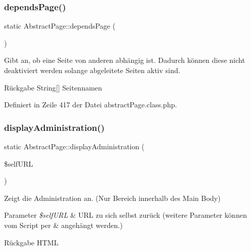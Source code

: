 \mbox{\label{class_abstract_page_a5b1e5f7cf097755dd4ede7a81742a192}} 
\subsubsection{\texorpdfstring{depends\+Page()}{dependsPage()}}
{\footnotesize\ttfamily static Abstract\+Page\+::depends\+Page (\begin{DoxyParamCaption}{ }\end{DoxyParamCaption})\hspace{0.3cm}{\ttfamily [static]}}

Gibt an, ob eine Seite von anderen abhängig ist. Dadurch können diese nicht deaktiviert werden solange abgeleitete Seiten aktiv sind. \begin{DoxyReturn}{Rückgabe}
String\mbox{[}\mbox{]} Seitennamen 
\end{DoxyReturn}


Definiert in Zeile 417 der Datei abstract\+Page.\+class.\+php.

\mbox{\label{class_abstract_page_afde426924e0eed6b25b17691b4129346}} 
\subsubsection{\texorpdfstring{display\+Administration()}{displayAdministration()}}
{\footnotesize\ttfamily static Abstract\+Page\+::display\+Administration (\begin{DoxyParamCaption}\item[{}]{\$self\+U\+RL }\end{DoxyParamCaption})\hspace{0.3cm}{\ttfamily [static]}}

Zeigt die Administration an. (Nur Bereich innerhalb des Main Body) 
\begin{DoxyParams}{Parameter}
{\em \$self\+U\+RL} & U\+RL zu sich selbst zurück (weitere Parameter können vom Script per \& angehängt werden.) \\
\hline
\end{DoxyParams}
\begin{DoxyReturn}{Rückgabe}
H\+T\+ML 
\end{DoxyReturn}


